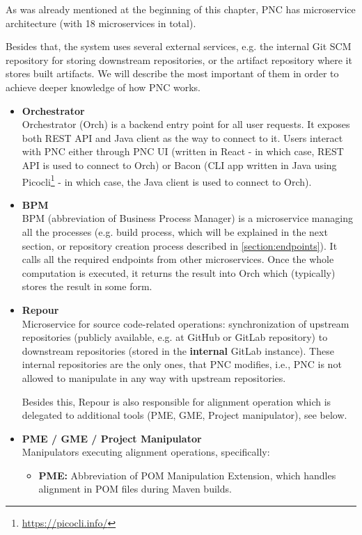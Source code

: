 \documentclass[../main.tex]{subfiles}
\begin{document}
As was already mentioned at the beginning of this chapter, PNC has microservice architecture (with 18 microservices in total).

Besides that, the system uses several external services, e.g. the internal Git SCM repository for storing downstream repositories, or the artifact repository where it stores built artifacts. We will describe the most important of them in order to achieve deeper knowledge of how PNC works.

\begin{itemize}
    \item \textbf{Orchestrator}\\
    Orchestrator (Orch) is a backend entry point for all user requests. It exposes both REST API and Java client as the way to connect to it. Users interact with PNC either through PNC UI (written in React - in which case, REST API is used to connect to Orch) or Bacon (CLI app written in Java using Picocli\footnote{\url{https://picocli.info/}} - in which case, the Java client is used to connect to Orch).

    \item \textbf{BPM}\\
    BPM (abbreviation of Business Process Manager) is a microservice managing all the processes (e.g. build process, which will be explained in the next section, or repository creation process described in \ref{section:endpoints}). It calls all the required endpoints from other microservices. Once the whole computation is executed, it returns the result into Orch which (typically) stores the result in some form.

    \item \textbf{Repour}\\
    Microservice for source code-related operations: synchronization of upstream repositories (publicly available, e.g. at GitHub or GitLab repository) to downstream repositories (stored in the \textbf{internal} GitLab instance). These internal repositories are the only ones, that PNC modifies, i.e., PNC is not allowed to manipulate in any way with upstream repositories.
    
    Besides this, Repour is also responsible for alignment operation which is delegated to additional tools (PME, GME, Project manipulator), see below.

    \item \textbf{PME / GME / Project Manipulator}\\
    Manipulators executing alignment operations, specifically:
    \begin{itemize}
        \item \textbf{PME:} Abbreviation of POM Manipulation Extension, which handles alignment in POM files during Maven builds.


\end{itemize}
\end{itemize}
\end{document}
